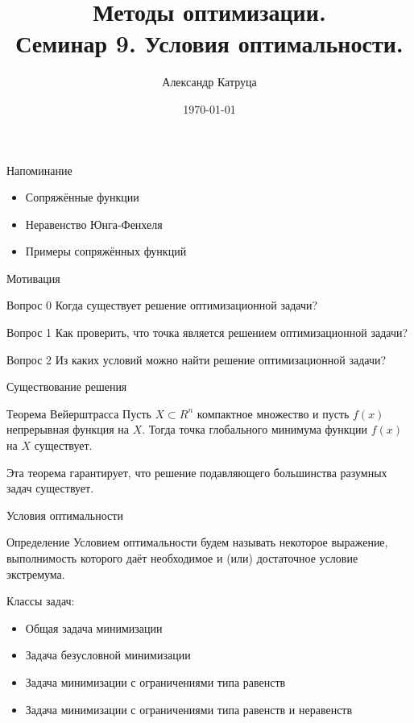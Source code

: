 \documentclass[12pt]{beamer}
\title[Семинар 9]{Методы оптимизации. \\
 Семинар 9. Условия оптимальности.}
\author{Александр Катруца}
\institute{Московский физико-технический институт\\
Факультет Управления и Прикладной Математики}
\date{\today}
\begin{document}
\begin{frame}
\maketitle
\end{frame}

\begin{frame}{Напоминание}
\begin{itemize}
\item Сопряжённые функции
\item Неравенство Юнга-Фенхеля
\item Примеры сопряжённых функций
\end{itemize}
\end{frame}

\begin{frame}{Мотивация}

\begin{block}{Вопрос 0}
Когда существует решение оптимизационной задачи?
\end{block}

\begin{block}{Вопрос 1}
Как проверить, что точка является решением оптимизационной задачи? 
\end{block}

\begin{block}{Вопрос 2}
Из каких условий можно найти решение оптимизационной задачи?
\end{block}

\end{frame}

\begin{frame}{Существование решения}
\begin{block}{Теорема Вейерштрасса}
Пусть $X \subset R^n$ компактное множество и пусть $f(x)$ непрерывная функция на $X$. 
Тогда точка глобального минимума функции $f (x)$ на $X$ существует.
\end{block}

Эта теорема гарантирует, что решение подавляющего большинства разумных задач существует.
 
\end{frame}

\begin{frame}{Условия оптимальности}
\begin{block}{Определение}
Условием оптимальности будем называть некоторое выражение, выполнимость которого даёт необходимое и (или) достаточное условие экстремума. 
\end{block}
Классы задач:
\begin{itemize}
\item Общая задача минимизации
\item Задача безусловной минимизации
\item Задача минимизации с ограничениями типа равенств
\item Задача минимизации с ограничениями типа равенств и неравенств
\end{itemize}
\end{frame}
\end{document}
